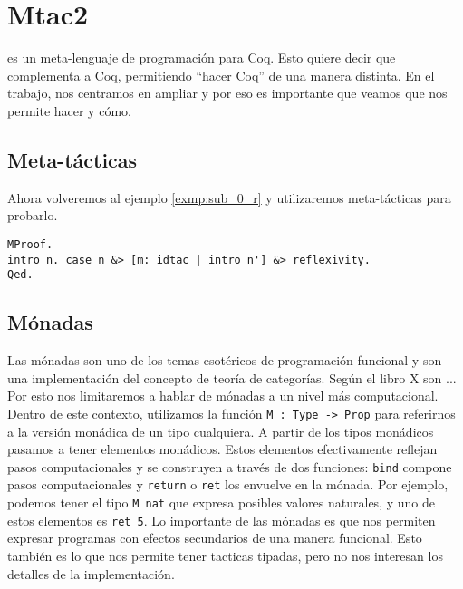 \chapter{Mtac2}\label{ch:mtac2}

\Mtac es un meta-lenguaje de programación para Coq. Esto quiere decir que complementa a Coq, permitiendo ``hacer Coq'' de una manera distinta. En el trabajo, nos centramos en ampliar \Mtac y por eso es importante que veamos que nos permite hacer y cómo.

\section{Meta-tácticas}

Ahora volveremos al ejemplo \ref{exmp:sub_0_r} y utilizaremos meta-tácticas para probarlo.
\begin{exmp}\label{exmp:sub_0_r_mtac2}
\begin{lstlisting}
MProof.
intro n. case n &> [m: idtac | intro n'] &> reflexivity.
Qed.
\end{lstlisting}
\end{exmp}

\section{Mónadas}
Las mónadas son uno de los temas esotéricos de programación funcional y son una implementación del concepto de teoría de categorías. Según el libro X son ...
Por esto nos limitaremos a hablar de mónadas a un nivel más computacional. Dentro de este contexto, utilizamos la función \lstinline{M : Type -> Prop} para referirnos a la versión monádica de un tipo cualquiera. A partir de los tipos monádicos pasamos a tener elementos monádicos. Estos elementos efectivamente reflejan pasos computacionales y se construyen a través de dos funciones: \lstinline{bind} compone pasos computacionales y \lstinline{return} o \lstinline{ret} los envuelve en la mónada. Por ejemplo, podemos tener el tipo \lstinline{M nat} que expresa posibles valores naturales, y uno de estos elementos es \lstinline{ret 5}. Lo importante de las mónadas es que nos permiten expresar programas con efectos secundarios de una manera funcional.
Esto también es lo que nos permite tener tacticas tipadas, pero no nos interesan los detalles de la implementación.

